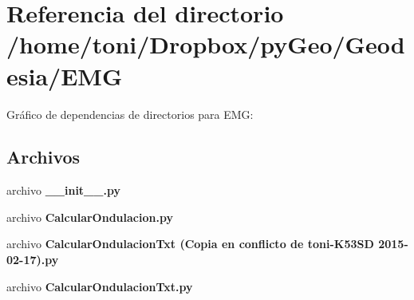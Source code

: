 \section{Referencia del directorio /home/toni/\-Dropbox/py\-Geo/\-Geodesia/\-E\-M\-G}
\label{dir_fb3cf0f7b25060feceb5851632e31eca}
Gráfico de dependencias de directorios para E\-M\-G\-:
\subsection*{Archivos}
\begin{DoxyCompactItemize}
\item 
archivo {\bf \-\_\-\-\_\-init\-\_\-\-\_\-.\-py}
\item 
archivo {\bf Calcular\-Ondulacion.\-py}
\item 
archivo {\bf Calcular\-Ondulacion\-Txt (\-Copia en conflicto de toni-\/\-K53\-S\-D 2015-\/02-\/17).\-py}
\item 
archivo {\bf Calcular\-Ondulacion\-Txt.\-py}
\end{DoxyCompactItemize}
